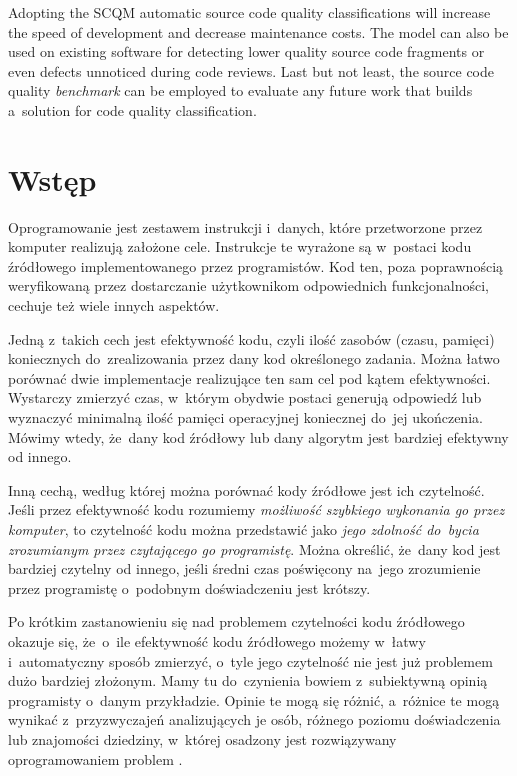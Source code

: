 \documentclass[twoside]{praca}
\begin{document}
Adopting the SCQM automatic source code quality classifications will increase the speed of development and decrease maintenance costs. The model can also be used on existing software for detecting lower quality source code fragments or even defects unnoticed during code reviews. Last but not least, the source code quality \textit{benchmark} can be employed to evaluate any future work that builds a~solution for code quality classification.




\cleardoublepage
{}
\setcounter{page}{1}
\chapter{Wstęp}
\label{ch:introduction} 

Oprogramowanie jest zestawem instrukcji i~danych, które przetworzone przez komputer realizują założone cele. Instrukcje te wyrażone są w~postaci kodu źródłowego implementowanego przez programistów. Kod ten, poza poprawnością weryfikowaną przez dostarczanie użytkownikom odpowiednich funkcjonalności, cechuje też wiele innych aspektów.

Jedną z~takich cech jest efektywność kodu, czyli ilość zasobów (czasu, pamięci) koniecznych do~zrealizowania przez dany kod określonego zadania. Można łatwo porównać dwie implementacje realizujące ten sam cel pod kątem efektywności. Wystarczy zmierzyć czas, w~którym obydwie postaci generują odpowiedź lub wyznaczyć minimalną ilość pamięci operacyjnej koniecznej do~jej ukończenia. Mówimy wtedy, że~dany kod źródłowy lub dany algorytm jest bardziej efektywny od innego.

Inną cechą, według której można porównać kody źródłowe jest ich czytelność. Jeśli przez efektywność kodu rozumiemy \textit{możliwość szybkiego wykonania go przez komputer}, to czytelność kodu można przedstawić jako \textit{jego zdolność do~bycia zrozumianym przez czytającego go programistę}. Można określić, że~dany kod jest bardziej czytelny od innego, jeśli średni czas poświęcony na~jego zrozumienie przez programistę o~podobnym doświadczeniu jest krótszy.

Po krótkim zastanowieniu się nad problemem czytelności kodu źródłowego okazuje się, że~o~ile efektywność kodu źródłowego możemy w~łatwy i~automatyczny sposób zmierzyć, o~tyle jego czytelność nie jest już problemem dużo bardziej złożonym. Mamy tu do~czynienia bowiem z~subiektywną opinią programisty o~danym przykładzie. Opinie te mogą się różnić, a~różnice te mogą wynikać z~przyzwyczajeń analizujących je osób, różnego poziomu doświadczenia lub znajomości dziedziny, w~której osadzony jest rozwiązywany oprogramowaniem problem \cite{collar2006role}.
\end{document}
